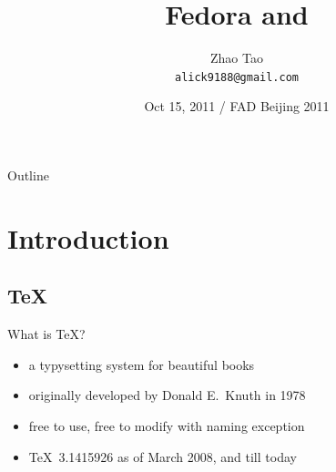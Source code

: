 \documentclass{beamer}
\title
{Fedora and \TL}
\author[alick] %
{Zhao Tao\\ \texttt{alick9188@gmail.com}}
\institute[Thu] %
{
  Department of Electronic Engineering\\
  Tsinghua University
}
\date[FAD Beijing 2011] %
{Oct 15, 2011 / FAD Beijing 2011}
\begin{document}
\begin{frame}
  \titlepage
\end{frame}

\begin{frame}{Outline}
  \tableofcontents
\end{frame}




\section{Introduction}

\subsection{\TeX}

\begin{frame}{What is \TeX ?}

  \begin{itemize}
    \item a typysetting system for beautiful books
    \item originally developed by Donald E.~Knuth in 1978
    \item free to use, free to modify with naming exception
    \item \TeX\ 3.1415926 as of March 2008, and till today
  \end{itemize}
\end{frame}
\end{document}
